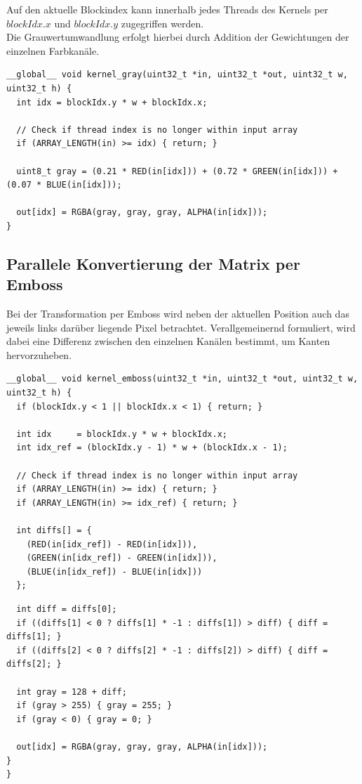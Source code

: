 \documentclass{llncs}
\begin{document}
Auf den aktuelle Blockindex kann innerhalb jedes Threads des Kernels per $blockIdx.x$ und $blockIdx.y$ zugegriffen werden.\\
\newpage
Die Grauwertumwandlung erfolgt hierbei durch Addition der Gewichtungen der einzelnen Farbkanäle. 

\begin{lstlisting}
__global__ void kernel_gray(uint32_t *in, uint32_t *out, uint32_t w, uint32_t h) {
  int idx = blockIdx.y * w + blockIdx.x;

  // Check if thread index is no longer within input array
  if (ARRAY_LENGTH(in) >= idx) { return; }

  uint8_t gray = (0.21 * RED(in[idx])) + (0.72 * GREEN(in[idx])) + (0.07 * BLUE(in[idx]));

  out[idx] = RGBA(gray, gray, gray, ALPHA(in[idx]));
}
\end{lstlisting}

%
\subsection{Parallele Konvertierung der Matrix per Emboss}
%

Bei der Transformation per Emboss wird neben der aktuellen Position auch das jeweils links darüber liegende Pixel betrachtet. Verallgemeinernd formuliert, wird dabei eine Differenz zwischen den einzelnen Kanälen bestimmt, um Kanten hervorzuheben.

\begin{lstlisting}
__global__ void kernel_emboss(uint32_t *in, uint32_t *out, uint32_t w, uint32_t h) {
  if (blockIdx.y < 1 || blockIdx.x < 1) { return; }

  int idx     = blockIdx.y * w + blockIdx.x;
  int idx_ref = (blockIdx.y - 1) * w + (blockIdx.x - 1);

  // Check if thread index is no longer within input array
  if (ARRAY_LENGTH(in) >= idx) { return; }
  if (ARRAY_LENGTH(in) >= idx_ref) { return; }

  int diffs[] = {
    (RED(in[idx_ref]) - RED(in[idx])),
    (GREEN(in[idx_ref]) - GREEN(in[idx])),
    (BLUE(in[idx_ref]) - BLUE(in[idx]))
  };
\end{lstlisting}
\newpage
\begin{lstlisting}
  int diff = diffs[0];
  if ((diffs[1] < 0 ? diffs[1] * -1 : diffs[1]) > diff) { diff = diffs[1]; }
  if ((diffs[2] < 0 ? diffs[2] * -1 : diffs[2]) > diff) { diff = diffs[2]; }

  int gray = 128 + diff;
  if (gray > 255) { gray = 255; }
  if (gray < 0) { gray = 0; }

  out[idx] = RGBA(gray, gray, gray, ALPHA(in[idx]));
}
}
\end{lstlisting}
%
\end{document}
